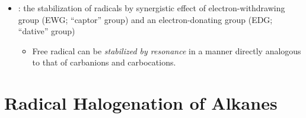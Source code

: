\begin{itemize}
\begin{itemize}
      \end{itemize}
    \item {}: the stabilization of radicals by synergistic effect of electron-withdrawing group (EWG\@; ``captor'' group) and an electron-donating group (EDG\@; ``dative'' group)
      \begin{itemize}
        \item Free radical can be \emph{stabilized by resonance }in a manner directly analogous to that of carbanions and carbocations.
      \end{itemize} 
\end{itemize}

\section{Radical Halogenation of Alkanes}\label{Radical Halogenation of Alkanes}
